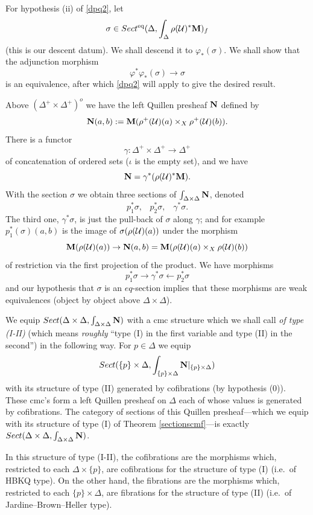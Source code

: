 For hypothesis (ii) of \ref{dpq2}, let
$$
\sigma \in
Sect ^{\rm eq}(\Delta , \int _{\Delta}\rho ({\cal U} )^{\ast}{\bf M} )_f
$$
(this is our descent datum). We shall descend it to $\varphi _{\ast}
(\sigma )$.
We shall show that the adjunction morphism
$$
\varphi ^{\ast} \varphi _{\ast} (\sigma )\rightarrow \sigma
$$
is an equivalence, after which \ref{dpq2} will apply to give the
desired result.



Above $(\Delta ^+\times \Delta ^+)^o$ we have the left Quillen
presheaf ${\bf N}$ defined by
$$
{\bf N} (a,b) := {\bf M} (\rho ^+ ({\cal U} )(a) \times _X \rho ^+ ({\cal U} )(b)).
$$
There is a functor
$$
\gamma : \Delta ^+ \times \Delta ^+ \rightarrow
\Delta ^+
$$
of concatenation of ordered sets ($\iota$ is the empty set),
and we have
$$
{\bf N} = \gamma ^{\ast} (\rho ({\cal U} )^{\ast}{\bf M} ).
$$
With the section $\sigma$ we obtain three sections of $\int _{\Delta \times
\Delta} {\bf N}$, denoted
$$
p_1^{\ast}\sigma , \;\;\;
p_2^{\ast}\sigma , \;\;\;
\gamma ^{\ast}\sigma .
$$
The third one, $\gamma ^{\ast}\sigma$, is just the pull-back of $\sigma$
along
$\gamma$; and for example $p_1^{\ast}(\sigma )(a,b)$ is the image of
$\sigma (\rho ({\cal U} )(a))$ under the morphism
$$
{\bf M} (\rho ({\cal U} )(a))\rightarrow {\bf N} (a,b) = {\bf M} (\rho ({\cal U} )(a)\times
_X\rho ({\cal U}
) (b))
$$
of restriction via the first projection of the product.
We have morphisms
$$
p_1^{\ast}\sigma \rightarrow \gamma ^{\ast} \sigma \leftarrow p_2^{\ast} \sigma
$$
and our hypothesis that $\sigma$ is an $eq$-section implies that these
morphisms are weak equivalences (object by object above
$\Delta
\times \Delta$).

We equip
$Sect (\Delta \times \Delta ,
\int _{\Delta \times \Delta}{\bf N} )$
with a cmc structure which we shall call {\em of type (I-II)} (which means
{\em roughly} ``type (I) in the first variable and type (II) in the
second'') in the following way. For $p\in \Delta$ we equip
$$
Sect (\{ p\} \times \Delta   ,
\int _{\{ p\} \times \Delta   }{\bf N} |_{\{ p\} \times \Delta })
$$
with its structure of type (II) generated by cofibrations (by
hypothesis (0)). These cmc's form a left Quillen presheaf on
$\Delta$ each of whose values is generated by cofibrations. The category of
sections of this Quillen presheaf---which we equip with its structure of type
(I) of Theorem \ref{sectionscmf}---is exactly $Sect (\Delta \times
\Delta , \int _{\Delta \times \Delta}{\bf N} )$.

In this structure of type (I-II), the cofibrations are the morphisms which,
restricted to each $\Delta \times \{ p\}$, are cofibrations for the
structure of type (I) (i.e.\ of HBKQ type). On the other hand, the
fibrations are the morphisms which, restricted to each $\{ p\} \times
\Delta$, are fibrations for the structure of type (II) (i.e.\ of
Jardine--Brown--Heller type).

